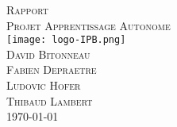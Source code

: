\documentclass[a4paper, 11pt]{article}
\begin{document}
\begin{titlepage}
\begin{center}
\textsc{\huge Rapport}\\[3cm]
\textsc{\Huge Projet Apprentissage Autonome}\\[3cm]
\texttt{[image: logo-IPB.png]}\\[3cm]
\textsc{\Large David Bitonneau}\\
\textsc{\Large Fabien Depraetre}\\
\textsc{\Large Ludovic Hofer}\\
\textsc{\Large Thibaud Lambert}\\[3cm]
\textsc{\Large \today}\\
\end{center}
\end{titlepage}

\clearpage
\tableofcontents
\clearpage


\end{document}
